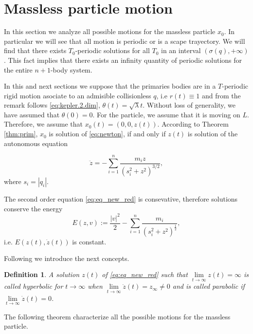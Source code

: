 \documentclass[twoside]{article}
\newtheorem{defi}[thm]{Definition}
\theoremstyle{remark}
\begin{document}
\section{Massless particle motion}\label{sec:mas-mot}
In this section we analyze all possible motions for the massless particle $x_0$. In particular we will see that all motion is periodic or is a scape trayectory. We will find that there exists $T_0$-periodic solutions for all $T_0$ in an interval  $(\sigma(q),+\infty)$. This fact implies that there exists an infinity quantity of periodic solutions for the entire $n+1$-body system.



In this and next sections we suppose that the primaries bodies are in a $T$-periodic rigid motion asociate to an admisible collisionless $q$, i.e  $r(t)\equiv 1$ and from the remark follows \eqref{eq:kepler.2.dim}, $\theta (t)=\sqrt{\lambda}t$. Without loss of generality,  we have assumed that $\theta(0)=0$. For the particle, we assume that it is moving on $L$. Therefore, we assume that $x_0(t)=(0,0,z(t))$. According to Theorem \ref{thm:prim}, $x_0$ is solution of \eqref{eq:newton}, if and only if $z(t)$ is solution of the autonomous equation


\begin{equation}\label{eq:eq_new_red}
 \ddot{z}=-\sum_{i=1}^n\frac{m_iz}{(s_i^2+z^2)^{3/2}},
\end{equation}
where $s_i=|q_i|$.

The second order equation \eqref{eq:eq_new_red} is consevative, therefore solutions conserve the energy
\begin{equation}\label{eq:conser.energ}
E(z,v):=\frac{|v|^2}{2}-\sum_{i=1}^{n} \frac{m_i}{\left(s_i^2+z^2\right)^{\frac12}},
\end{equation}
i.e. $E(z(t),\dot{z}(t))$ is constant.



Following \cite{marchesin2013spatial} we introduce the next concepts.
\begin{defi}
 A solution $z(t)$ of \eqref{eq:eq_new_red} such that  $\lim\limits_{t\to\infty}z(t)=\infty$ is called hyperbolic for $t\to \infty$ when $\lim\limits_{t\to\infty}\dot{z}(t)= z_{\infty}\neq 0$ and is called parabolic if $\lim\limits_{t\to\infty}\dot{z}(t)=0$.
\end{defi}






The following theorem characterize all the possible motions for the massless particle.
\end{document}
